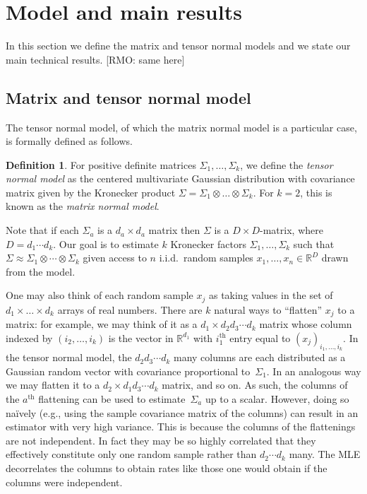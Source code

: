 \documentclass[aos]{imsart}
\theoremstyle{definition}
\newtheorem{definition}[theorem]{Definition}
\numberwithin{equation}{section}
\newcommand{\R}{{\mathbb{R}}}
\newcommand{\ot}{\otimes}
\newcommand{\RMO}[1]{{\color{olive}[RMO: #1]}}
\newcommand{\RMO}[1]{{}}
\begin{document}
\section{Model and main results}\label{sec:main results}
In this section we define the matrix and tensor normal models and we state our main technical results.
\RMO{same here}

\subsection{Matrix and tensor normal model}\label{subsec:model}
The tensor normal model, of which the matrix normal model is a particular case, is formally defined as follows.

\begin{definition}
For positive definite matrices $\Sigma_1,\dots,\Sigma_k$, we define the \emph{tensor normal model} as the centered multivariate Gaussian distribution with covariance matrix given by the Kronecker product $\Sigma = \Sigma_1 \ot \dots \ot \Sigma_k$.
For $k=2$, this is known as the \emph{matrix normal model}.
\end{definition}

\noindent
Note that if each $\Sigma_a$ is a $d_a\times d_a$ matrix then $\Sigma$ is a $D\times D$-matrix, where $D=d_1 \cdots d_k$.
Our goal is to estimate $k$ Kronecker factors $\Sigma_1, \dots, \Sigma_k$ such that $\Sigma \approx \Sigma_1 \ot \cdots \ot \Sigma_k$ given access to $n$ i.i.d.\ random samples $x_1, \dots, x_n \in \R^D$ drawn from the model.

One may also think of each random sample $x_j$ as taking values in the set of $d_1 \times \dots \times d_k$ arrays of real numbers.
There are $k$ natural ways to ``flatten'' $x_j$ to a matrix:
for example, we may think of it as a $d_1 \times d_2d_3\cdots{}d_k$ matrix whose column indexed by $(i_2,\dots, i_k)$ is the vector in $\R^{d_1}$ with $i_1^{\text{th}}$ entry equal to $(x_j)_{i_1, \dots, i_k}$.
In the tensor normal model, the $d_2d_3\cdots{}d_k$ many columns are each distributed as a Gaussian random vector with covariance proportional to~$\Sigma_1$.
In an analogous way we may flatten it to a $d_2 \times d_1d_3\cdots{}d_k$ matrix, and so on.
As such, the columns of the $a^{\text{th}}$ flattening can be used to estimate~$\Sigma_a$ up to a scalar.
However, doing so na\"ively (e.g., using the sample covariance matrix of the columns) can result in an estimator with very high variance.
This is because the columns of the flattenings are not independent.
In fact they may be so highly correlated that they effectively constitute only one random sample rather than $d_2\cdots{}d_k$ many.
The MLE decorrelates the columns to obtain rates like those one would obtain if the columns were independent.
\end{document}
